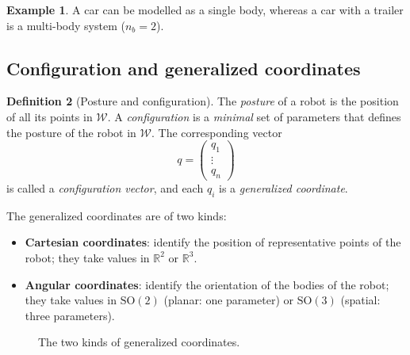 \documentclass[11pt,a4paper]{article}
\newcommand{\R}{\mathbb{R}}
\newcommand{\W}{\mathcal{W}}
\newcommand{\SO}{\mathrm{SO}}
\theoremstyle{definition}
\newtheorem{definition}{Definition}[section]
\newtheorem{example}[definition]{Example}
\theoremstyle{plain}
\begin{document}
\begin{example}
A car can be modelled as a single body, whereas a car with a trailer is a multi-body system ($n_b=2$).
\end{example}

\subsection{Configuration and generalized coordinates}

\begin{definition}[Posture and configuration]
The \emph{posture} of a robot is the position of all its points in $\W$. A \emph{configuration} is a \emph{minimal} set of parameters that defines the posture of the robot in $\W$. The corresponding vector
\[
  q=\begin{pmatrix} q_1\\ \vdots\\ q_n\end{pmatrix}
\]
is called a \emph{configuration vector}, and each $q_i$ is a \emph{generalized coordinate}.
\end{definition}

The generalized coordinates are of two kinds:
\begin{itemize}[nosep]
  \item \textbf{Cartesian coordinates}: identify the position of representative points of the robot; they take values in $\R^2$ or $\R^3$.
  \item \textbf{Angular coordinates}: identify the orientation of the bodies of the robot; they take values in $\SO(2)$ (planar: one parameter) or $\SO(3)$ (spatial: three parameters).
\end{itemize}


\begin{figure}[ht]
\centering
{}
\caption{The two kinds of generalized coordinates.}
\end{figure}
\end{document}
